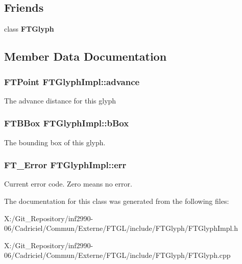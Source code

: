 \subsection*{Friends}
\begin{DoxyCompactItemize}
\item 
\hypertarget{class_f_t_glyph_impl_a908ad68576153727d761f276dd8fd0e2}{class {\bfseries F\-T\-Glyph}}\label{class_f_t_glyph_impl_a908ad68576153727d761f276dd8fd0e2}

\end{DoxyCompactItemize}


\subsection{Member Data Documentation}
\hypertarget{class_f_t_glyph_impl_acd0a260e13ec1714c2556d24a5352a31}{
\subsubsection[{advance}]{\setlength{\rightskip}{0pt plus 5cm}F\-T\-Point F\-T\-Glyph\-Impl\-::advance\hspace{0.3cm}{\ttfamily [protected]}}}\label{class_f_t_glyph_impl_acd0a260e13ec1714c2556d24a5352a31}
The advance distance for this glyph \hypertarget{class_f_t_glyph_impl_a871a6a1a24be465bfae17b7a8e464b3c}{
\subsubsection[{b\-Box}]{\setlength{\rightskip}{0pt plus 5cm}F\-T\-B\-Box F\-T\-Glyph\-Impl\-::b\-Box\hspace{0.3cm}{\ttfamily [protected]}}}\label{class_f_t_glyph_impl_a871a6a1a24be465bfae17b7a8e464b3c}
The bounding box of this glyph. \hypertarget{class_f_t_glyph_impl_a7a489998b09aef9ceb733604166e933c}{
\subsubsection[{err}]{\setlength{\rightskip}{0pt plus 5cm}F\-T\-\_\-\-Error F\-T\-Glyph\-Impl\-::err\hspace{0.3cm}{\ttfamily [protected]}}}\label{class_f_t_glyph_impl_a7a489998b09aef9ceb733604166e933c}
Current error code. Zero means no error. 

The documentation for this class was generated from the following files\-:\begin{DoxyCompactItemize}
\item 
X\-:/\-Git\-\_\-\-Repository/inf2990-\/06/\-Cadriciel/\-Commun/\-Externe/\-F\-T\-G\-L/include/\-F\-T\-Glyph/F\-T\-Glyph\-Impl.\-h\item 
X\-:/\-Git\-\_\-\-Repository/inf2990-\/06/\-Cadriciel/\-Commun/\-Externe/\-F\-T\-G\-L/include/\-F\-T\-Glyph/F\-T\-Glyph.\-cpp\end{DoxyCompactItemize}
